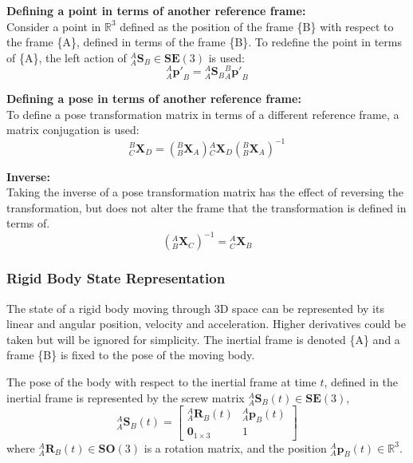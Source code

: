 		\textbf{Defining a point in terms of another reference frame:}\\
		Consider a point in $\mathbb{R}^3$ defined as the position of the frame \{B\} with respect to the frame \{A\}, defined in terms of the frame \{B\}. To redefine the point in terms of \{A\}, the left action of ${^{A}_{A}\mathbf{S}^{}_{B}} \in \mathbf{SE}(3)$ is used:
		\begin{equation}
			{^{A}_{A}\mathbf{p'}^{}_{B}} = {^{A}_{A}\mathbf{S}^{}_{B}}{^{B}_{A}\mathbf{p'}^{}_{B}}
		\end{equation}
		
		\textbf{Defining a pose in terms of another reference frame:}\\
		To define a pose transformation matrix in terms of a different reference frame, a matrix conjugation is used:
		\begin{equation}
			{^{B}_{C}\mathbf{X}^{}_{D}} = ({^{B}_{B}\mathbf{X}^{}_{A}}){^{A}_{C}\mathbf{X}^{}_{D}}({^{B}_{B}\mathbf{X}^{}_{A}})^{-1}
		\end{equation}

		\textbf{Inverse:}\\
		Taking the inverse of a pose transformation matrix has the effect of reversing the transformation, but does not alter the frame that the transformation is defined in terms of.
		\begin{equation}
			({^{A}_{B}\mathbf{X}^{}_{C}})^{-1} = {^{A}_{C}\mathbf{X}^{}_{B}}
		\end{equation}
	
	\subsubsection{Rigid Body State Representation} \label{state rep}
		The state of a rigid body moving through 3D space can be represented by its linear and angular position, velocity and acceleration. Higher derivatives could be taken but will be ignored for simplicity.
		The inertial frame is denoted \{A\} and a frame \{B\} is fixed to the pose of the moving body.
		
		The pose of the body with respect to the inertial frame at time $t$, defined in the inertial frame is represented by the screw matrix ${^{A}_{A}\mathbf{S}^{}_{B}(t)} \in \mathbf{SE}(3)$,
		\begin{equation}
				{^{A}_{A}\mathbf{S}^{}_{B}(t)} = 
				\begin{bmatrix}
						  ^{A}_{A}\mathbf{R}^{}_{B}(t) 	& 	^{A}_{A}\mathbf{p}^{}_{B}(t)\\
						  \textbf{0}_{1 \times 3} & 1						  
				\end{bmatrix}
		\end{equation}
		where $^{A}_{A}\mathbf{R}^{}_{B}(t) \in \mathbf{SO}(3)$ is a rotation matrix, and the position $^{A}_{A}\mathbf{p}^{}_{B}(t) \in \mathbb{R}^3$.
		
